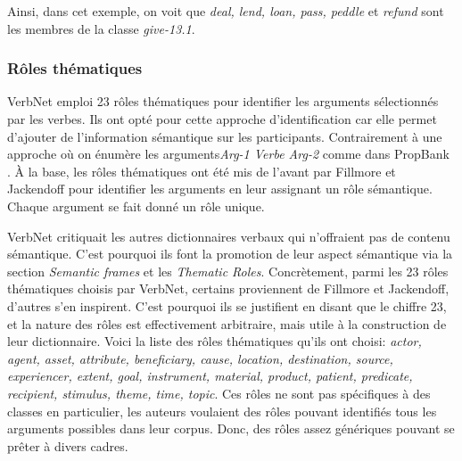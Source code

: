 Ainsi, dans cet exemple, on voit que \emph{deal, lend, loan, pass, peddle} et \emph{refund} sont les membres de la classe \emph{give-13.1}.

\subsubsection{Rôles thématiques}

VerbNet emploi 23 rôles thématiques pour identifier les arguments sélectionnés par les verbes. Ils ont opté pour cette approche d'identification car elle permet d'ajouter de l'information sémantique sur les participants. Contrairement à une approche où on énumère les arguments\emph{Arg-1 Verbe Arg-2} comme dans PropBank \citep{PalmerPropositionBankAnnotated2005}. À la base, les rôles thématiques ont été mis de l'avant par Fillmore \citep{fillmore:case} et Jackendoff \citep{Jackendoff1972-JACSII-2} pour identifier les arguments en leur assignant un rôle sémantique. Chaque argument se fait donné un rôle unique.

VerbNet critiquait les autres dictionnaires verbaux qui n'offraient pas de contenu sémantique. C'est pourquoi ils font la promotion de leur aspect sémantique via la section \emph{Semantic frames} et les \emph{Thematic Roles}\citep{SchulerVerbnetBroadcoverageComprehensive2005}. Concrètement, parmi les 23 rôles thématiques choisis par VerbNet, certains proviennent de Fillmore et Jackendoff, d'autres s'en inspirent. C'est pourquoi ils se justifient en disant que le chiffre 23, et la nature des rôles est effectivement arbitraire, mais utile à la construction de leur dictionnaire. Voici la liste des rôles thématiques qu'ils ont choisi: \emph{actor, agent, asset, attribute, beneficiary, cause, location, destination, source, experiencer, extent, goal, instrument, material, product, patient, predicate, recipient, stimulus, theme, time, topic}. Ces rôles ne sont pas spécifiques à des classes en particulier, les auteurs voulaient des rôles pouvant identifiés tous les arguments possibles dans leur corpus. Donc, des rôles assez génériques pouvant se prêter à divers cadres.


	

